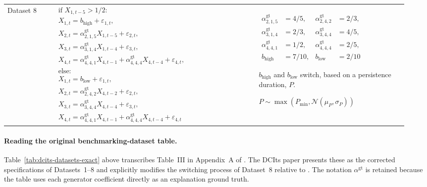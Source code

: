 \begin{landscape}
\begin{longtable}{@{}
>{\raggedright\arraybackslash}p{0.10\linewidth}
>{\raggedright\arraybackslash}p{0.49\linewidth}
>{\raggedright\arraybackslash}p{0.35\linewidth}@{}}
Dataset 8 &
$\begin{aligned}
&\text{if }X_{1,t-5}>1/2:\\
&X_{1,t}=b_{\mathrm{high}}+\varepsilon_{1,t},\\
&X_{2,t}=\alpha_{2,1,5}^{\mathrm{gt}}X_{1,t-5}+\varepsilon_{2,t},\\
&X_{3,t}=\alpha_{3,1,4}^{\mathrm{gt}}X_{1,t-4}+\varepsilon_{3,t},\\
&X_{4,t}=\alpha_{4,4,1}^{\mathrm{gt}}X_{4,t-1}
       +\alpha_{4,4,4}^{\mathrm{gt}}X_{4,t-4}+\varepsilon_{4,t},\\
&\text{else:}\\
&X_{1,t}=b_{\mathrm{low}}+\varepsilon_{1,t},\\
&X_{2,t}=\alpha_{2,4,2}^{\mathrm{gt}}X_{4,t-2}+\varepsilon_{2,t},\\
&X_{3,t}=\alpha_{3,4,4}^{\mathrm{gt}}X_{4,t-4}+\varepsilon_{3,t},\\
&X_{4,t}=\alpha_{4,4,1}^{\mathrm{gt}}X_{4,t-1}
       +\alpha_{4,4,4}^{\mathrm{gt}}X_{4,t-4}+\varepsilon_{4,t}
\end{aligned}$ &
$\begin{aligned}
\alpha_{2,1,5}^{\mathrm{gt}}&=4/5,&
\alpha_{2,4,2}^{\mathrm{gt}}&=2/3,\\
\alpha_{3,1,4}^{\mathrm{gt}}&=2/3,&
\alpha_{3,4,4}^{\mathrm{gt}}&=4/5,\\
\alpha_{4,4,1}^{\mathrm{gt}}&=1/2,&
\alpha_{4,4,4}^{\mathrm{gt}}&=2/5,\\
b_{\mathrm{high}}&=7/10,&
b_{\mathrm{low}}&=2/10
\end{aligned}$

\medskip
$b_{\mathrm{high}}$ and $b_{\mathrm{low}}$ switch, based on a persistence
duration, $P$.

\medskip
$P\sim\max\!\left(P_{\min},\mathcal{N}(\mu_P,\sigma_P)\right)$ \\

\end{longtable}
\endgroup
\end{landscape}

\paragraph{Reading the original benchmarking-dataset table.}
Table~\ref{tab:dcits-datasets-exact} above transcribes Table~III in Appendix~A
of \citet{baric2026dcits}. The DCIts paper presents these as the corrected
specifications of Datasets~1--8 and explicitly modifies the switching process
of Dataset~8 relative to \citet{baric2021benchmarking}. The notation
$\alpha^{\mathrm{gt}}$ is retained because the table uses each generator
coefficient directly as an explanation ground truth.

